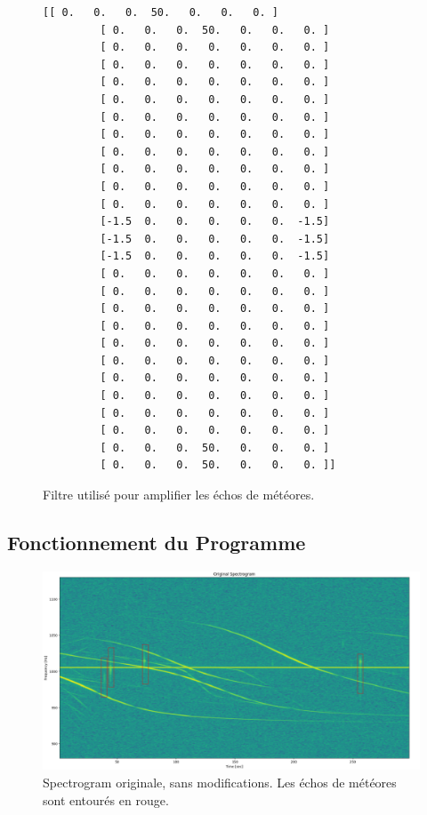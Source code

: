 \documentclass[11pt]{article}
\begin{document}
\begin{figure}
    \begin{lstlisting}[style=CStyle]
        [[ 0.   0.   0.  50.   0.   0.   0. ]
         [ 0.   0.   0.  50.   0.   0.   0. ]
         [ 0.   0.   0.   0.   0.   0.   0. ]
         [ 0.   0.   0.   0.   0.   0.   0. ]
         [ 0.   0.   0.   0.   0.   0.   0. ]
         [ 0.   0.   0.   0.   0.   0.   0. ]
         [ 0.   0.   0.   0.   0.   0.   0. ]
         [ 0.   0.   0.   0.   0.   0.   0. ]
         [ 0.   0.   0.   0.   0.   0.   0. ]
         [ 0.   0.   0.   0.   0.   0.   0. ]
         [ 0.   0.   0.   0.   0.   0.   0. ]
         [ 0.   0.   0.   0.   0.   0.   0. ]
         [-1.5  0.   0.   0.   0.   0.  -1.5]
         [-1.5  0.   0.   0.   0.   0.  -1.5]
         [-1.5  0.   0.   0.   0.   0.  -1.5]
         [ 0.   0.   0.   0.   0.   0.   0. ]
         [ 0.   0.   0.   0.   0.   0.   0. ]
         [ 0.   0.   0.   0.   0.   0.   0. ]
         [ 0.   0.   0.   0.   0.   0.   0. ]
         [ 0.   0.   0.   0.   0.   0.   0. ]
         [ 0.   0.   0.   0.   0.   0.   0. ]
         [ 0.   0.   0.   0.   0.   0.   0. ]
         [ 0.   0.   0.   0.   0.   0.   0. ]
         [ 0.   0.   0.   0.   0.   0.   0. ]
         [ 0.   0.   0.   0.   0.   0.   0. ]
         [ 0.   0.   0.  50.   0.   0.   0. ]
         [ 0.   0.   0.  50.   0.   0.   0. ]]
    \end{lstlisting}
    \caption{Filtre utilisé pour amplifier les échos de météores.}
\end{figure}

\subsection{Fonctionnement du Programme}

\begin{figure}[t]
    \begin{center}
        \includegraphics[scale=0.25]{Screenshot from 2022-05-31 16-44-50.png}
        \caption{Spectrogram originale, sans modifications. Les échos de météores sont entourés en rouge.}
    \end{center}
\end{figure}
\end{document}
